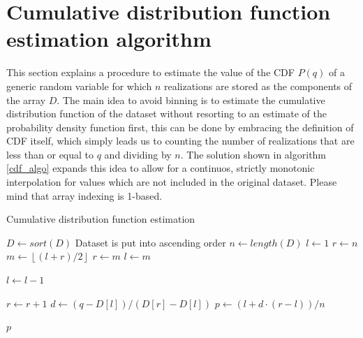 \documentclass[10pt,final]{siamltex}
\begin{document}
\section{Cumulative distribution function estimation algorithm}\label{cdf}
%
This section explains a procedure to estimate the value of the CDF $P(q)$ of a generic random variable for which $n$ realizations are stored as the components of the array $D$.
The main idea to avoid binning is to estimate the cumulative distribution function of the dataset without resorting to an estimate of the probability density function first, this can be done by embracing the definition of CDF itself, which simply leads us to counting the number of realizations that are less than or equal to $q$ and dividing by $n$. The solution shown in algorithm \ref{cdf_algo} expands this idea to allow for a continuos, strictly monotonic interpolation for values which are not included in the original dataset. Please mind that array indexing is 1-based.

\begin{algorithm}
  \caption{Cumulative distribution function estimation}
  \label{cdf_algo}
  \begin{algorithmic}[1]
    \State $D \gets sort(D)$
    \Comment Dataset is put into ascending order
    \State $n \gets length(D)$
    \State $l \gets 1$
    \State $r \gets n$
    \State $m \gets \left \lfloor{(l+r)/2}\right \rfloor$
    \State $r \gets m$
    \Else
    \State $l \gets m$
    \EndIf
    \EndWhile


    \State $l \gets l - 1$
    \EndWhile

    \State $r \gets r + 1$
    \EndWhile
    \State $d \gets (q-D[l])/(D[r]-D[l])$
    \State $p \gets (l + d \cdot (r - l))/n $

    \EndIf

    \State \Return $p$
    \EndFunction
  \end{algorithmic}
\end{algorithm}
\end{document}
